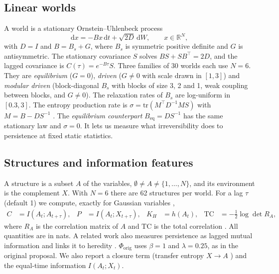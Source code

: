 \documentclass[11pt]{article}
\newcommand{\Phiorig}{\Phi_{\mathrm{orig}}}
\newcommand{\TC}{\mathrm{TC}}
\begin{document}
\subsection{Linear worlds}
A world is a stationary Ornstein--Uhlenbeck process \cite{Gardiner04,Risken89}
\begin{equation}
  \mathrm{d}x = -Bx\,\mathrm{d}t + \sqrt{2D}\,\mathrm{d}W, \qquad x\in\mathbb{R}^N,
\end{equation}
with $D=I$ and $B = B_s + G$, where $B_s$ is symmetric positive definite and $G$ is antisymmetric. The stationary
covariance $S$ solves $BS + SB^\top = 2D$, and the lagged covariance is $C(\tau) = e^{-B\tau}S$. Three families of 30 worlds each use $N=6$. They are \emph{equilibrium} ($G=0$), \emph{driven} ($G\neq0$ with scale drawn in $[1,3]$) and
\emph{modular driven} (block-diagonal $B_s$ with blocks of size 3, 2 and 1, weak coupling between blocks, and $G\neq0$).
The relaxation rates of $B_s$ are log-uniform in $[0.3,3]$. The entropy production rate is
$\sigma = \mathrm{tr}(M^\top D^{-1} M S)$ with $M = B - DS^{-1}$ \cite{Tome06,SpinneyFord12}. The \emph{equilibrium
counterpart} $B_{\mathrm{eq}} = DS^{-1}$ has the same stationary law and $\sigma = 0$. It lets us measure what
irreversibility does to persistence at fixed static statistics.

\subsection{Structures and information features}
A structure is a subset $A$ of the variables, $\emptyset \neq A \neq \{1,\dots,N\}$, and its environment is the
complement $X$. With $N=6$ there are 62 structures per world. For a lag $\tau$ (default 1) we compute, exactly for
Gaussian variables \cite{CoverThomas06},
\begin{align}
  C &= I(A_t; A_{t+\tau}), &
  P &= I(A_t; X_{t+\tau}), &
  K_H &= h(A_t), &
  \TC &= -\tfrac12 \log\det R_A ,
\end{align}
where $R_A$ is the correlation matrix of $A$ and $\TC$ is the total correlation \cite{Watanabe60}. All quantities are
in nats. A related work also measures persistence as lagged mutual information and links it to heredity
\cite{TzeliosBishop21}. $\Phiorig$ uses $\beta=1$ and $\lambda=0.25$, as in the original proposal. We also report a closure term
(transfer entropy $X\to A$ \cite{Schreiber00}) and the equal-time information $I(A_t;X_t)$.
\end{document}
